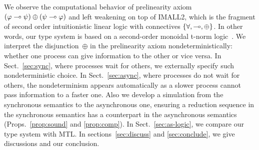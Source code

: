 \documentclass[envcountsame]{llncs}
\begin{document}
We observe the computational behavior of prelinearity axiom
$(\varphi\multimap\psi)\oplus(\psi\multimap\varphi)$ and left weakening
on top of IMALL2, which is the fragment of second order
intuitionistic linear logic with connectives $\{\forall, \multimap,
\oplus\}$.  In other words, our type system is based on a second-order
monoidal t-norm logic~\citep{Esteva2001271}.
We interpret the disjunction~$\oplus$ in the prelinearity axiom
nondeterministically: whether
one process can give information to the other or
vice versa.
In Sect.~\ref{sec:sync}, where processes wait for others,
we externally specify such nondeterministic choice.
In Sect.~\ref{sec:async}, where processes do not wait for others,
the nondeterminism appears automatically as a slower process cannot pass
information to a faster one.
%
%
Also we
develop a simulation from the synchronous semantics to the
asynchronous one, ensuring a reduction sequence in the synchronous
semantics has a counterpart in the asynchronous semantics
(Props.~\ref{prop:sound} and \ref{prop:comp}).
In Sect.~\ref{sec:as-logic}, we compare our type system with MTL.
In sections~\ref{sec:discuss} and \ref{sec:conclude}, we give discussions
and our conclusion.

\end{document}
